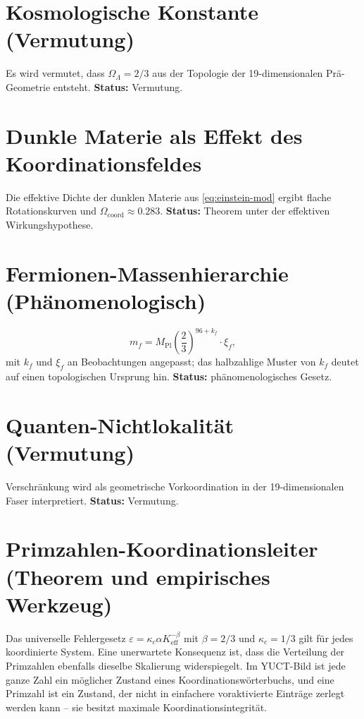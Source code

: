\documentclass[11pt,a4paper]{article}
\newcommand{\coord}{\mathrm{coord}}
\begin{document}
	\section{Kosmologische Konstante (Vermutung)}
	\label{sec:Lambda}
	Es wird vermutet, dass \(\Omega_\Lambda = 2/3\) aus der Topologie der 19-dimensionalen Prä-Geometrie entsteht. \textbf{Status:} Vermutung.
	
	\section{Dunkle Materie als Effekt des Koordinationsfeldes}
	\label{sec:DM}
	Die effektive Dichte der dunklen Materie aus \eqref{eq:einstein-mod} ergibt flache Rotationskurven und \(\Omega_{\coord} \approx 0.283\). \textbf{Status:} Theorem unter der effektiven Wirkungshypothese.
	
	\section{Fermionen-Massenhierarchie (Phänomenologisch)}
	\label{sec:masses}
	\[
	m_f = M_{\mathrm{Pl}} \left(\frac{2}{3}\right)^{96 + k_f} \cdot \xi_f,
	\]
	mit \(k_f\) und \(\xi_f\) an Beobachtungen angepasst; das halbzahlige Muster von \(k_f\) deutet auf einen topologischen Ursprung hin. \textbf{Status:} phänomenologisches Gesetz.
	
	\section{Quanten-Nichtlokalität (Vermutung)}
	\label{sec:nonlocality}
	Verschränkung wird als geometrische Vorkoordination in der 19-dimensionalen Faser interpretiert. \textbf{Status:} Vermutung.
	
	\section{Primzahlen-Koordinationsleiter (Theorem und empirisches Werkzeug)}
	\label{sec:primes}
	
	Das universelle Fehlergesetz \(\varepsilon = \kappa_c\alpha K_{\mathrm{eff}}^{-\beta}\) mit \(\beta=2/3\) und \(\kappa_c=1/3\) gilt für jedes koordinierte System. Eine unerwartete Konsequenz ist, dass die Verteilung der Primzahlen ebenfalls dieselbe Skalierung widerspiegelt. Im YUCT-Bild ist jede ganze Zahl ein möglicher Zustand eines Koordinationswörterbuchs, und eine Primzahl ist ein Zustand, der nicht in einfachere voraktivierte Einträge zerlegt werden kann – sie besitzt maximale Koordinationsintegrität.
	
\end{document}
